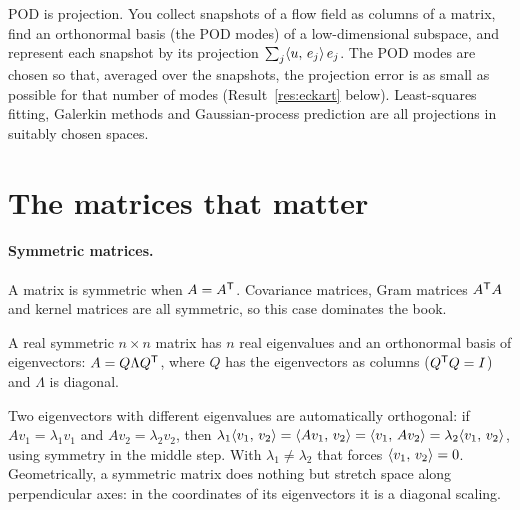 \begin{connection}
POD is projection. You collect snapshots of a flow field as columns of a matrix, find an orthonormal basis (the POD
modes) of a low-dimensional subspace, and represent each snapshot by its projection $\sum_j \langle u,\, e_j\rangle\, e_j$. The
POD modes are chosen so that, averaged over the snapshots, the projection error is as small as possible for that
number of modes (Result~\ref{res:eckart} below). Least-squares fitting, Galerkin methods and Gaussian-process
prediction are all projections in suitably chosen spaces.
\end{connection}

\section{The matrices that matter}

\paragraph{Symmetric matrices.} A matrix is symmetric when $A = A^{\mathsf{T}}$. Covariance matrices, Gram matrices $A^{\mathsf{T}} A$ and
kernel matrices are all symmetric, so this case dominates the book.

\begin{result}
A real symmetric $n\times n$ matrix has $n$ real eigenvalues and an orthonormal basis of eigenvectors:
$A = Q \Lambda Q^{\mathsf{T}}$, where $Q$ has the eigenvectors as columns ($Q^{\mathsf{T}} Q = I$) and $\Lambda$ is diagonal.
\end{result}
\begin{intuition}
Two eigenvectors with different eigenvalues are automatically orthogonal: if $Av_1 = \lambda_1 v_1$ and
$Av_2 = \lambda_2 v_2$, then
$\lambda_1 \langle v_1,\, v_2\rangle = \langle Av_1,\, v_2\rangle = \langle v_1,\, Av_2\rangle = \lambda_2 \langle v_1,\, v_2\rangle$, using symmetry in the
middle step. With $\lambda_1 \ne \lambda_2$ that forces $\langle v_1,\, v_2\rangle = 0$. Geometrically, a symmetric matrix
does nothing but stretch space along perpendicular axes: in the coordinates of its eigenvectors it is a diagonal
scaling.
\end{intuition}

